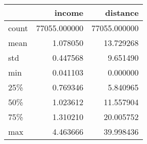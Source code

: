 \begin{tabular}{lrr}
\toprule
{} &        income &      distance \\
\midrule
count &  77055.000000 &  77055.000000 \\
mean  &      1.078050 &     13.729268 \\
std   &      0.447568 &      9.651490 \\
min   &      0.041103 &      0.000000 \\
25\%   &      0.769346 &      5.840965 \\
50\%   &      1.023612 &     11.557904 \\
75\%   &      1.310210 &     20.005752 \\
max   &      4.463666 &     39.998436 \\
\bottomrule
\end{tabular}
